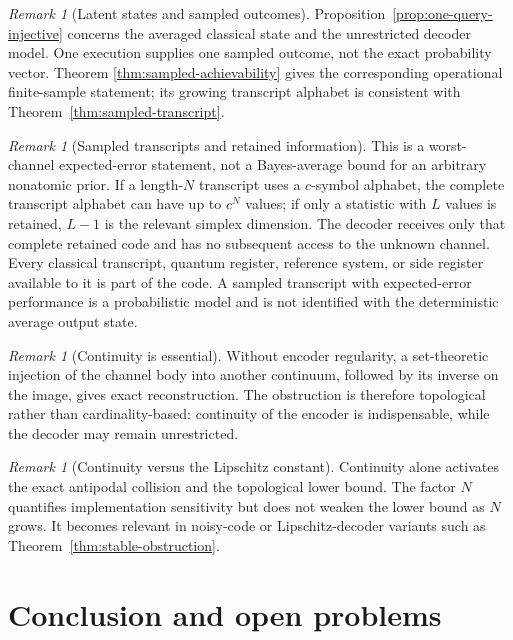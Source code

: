 \documentclass[11pt,a4paper]{article}
\theoremstyle{definition}
\theoremstyle{plain}
\theoremstyle{remark}
\newtheorem{remark}[theorem]{Remark}
\begin{document}
\begin{remark}[Latent states and sampled outcomes]
Proposition~\ref{prop:one-query-injective} concerns the averaged classical
state and the unrestricted decoder model. One execution supplies one
sampled outcome, not the exact probability vector. Theorem
\ref{thm:sampled-achievability} gives the corresponding operational
finite-sample statement; its growing transcript alphabet is consistent with
Theorem~\ref{thm:sampled-transcript}.
\end{remark}

\begin{remark}[Sampled transcripts and retained information]
This is a worst-channel expected-error statement, not a Bayes-average bound
for an arbitrary nonatomic prior. If a length-$N$ transcript uses a
$c$-symbol alphabet, the complete transcript alphabet can have up to $c^N$
values; if only a statistic with $L$ values is retained, $L-1$ is the
relevant simplex dimension. The decoder receives only that complete
retained code and has no subsequent access to the unknown channel. Every
classical transcript, quantum register, reference system, or side register
available to it is part of the code. A sampled transcript with
expected-error performance is a probabilistic model and is not identified
with the deterministic average output state.
\end{remark}

\begin{remark}[Continuity is essential]
Without encoder regularity, a set-theoretic injection of the channel body
into another continuum, followed by its inverse on the image, gives exact
reconstruction. The obstruction is therefore topological rather than
cardinality-based: continuity of the encoder is indispensable, while the
decoder may remain unrestricted.
\end{remark}

\begin{remark}[Continuity versus the Lipschitz constant]
Continuity alone activates the exact antipodal collision and the topological
lower bound. The factor $N$ quantifies implementation sensitivity but does not
weaken the lower bound as $N$ grows. It becomes relevant in noisy-code or
Lipschitz-decoder variants such as Theorem~\ref{thm:stable-obstruction}.
\end{remark}

\section{Conclusion and open problems}
\label{sec:conclusion}
\end{document}
